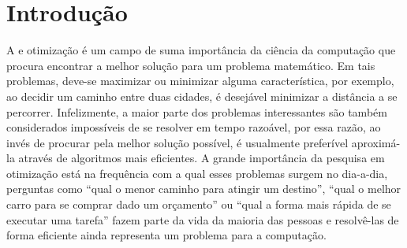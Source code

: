 \chapter[Introdução]{Introdução}

A e otimização é um campo de suma importância da ciência da computação que procura encontrar a melhor solução para um problema matemático. Em tais problemas, deve-se maximizar ou minimizar alguma característica, por exemplo, ao decidir um caminho entre duas cidades, é desejável minimizar a distância a se percorrer. Infelizmente, a maior parte dos problemas interessantes são também considerados impossíveis de se resolver em tempo razoável, por essa razão, ao invés de procurar pela melhor solução possível, é usualmente preferível aproximá-la através de algoritmos mais eficientes. A grande importância da pesquisa em otimização está na frequência com a qual esses problemas surgem no dia-a-dia, perguntas como ``qual o menor caminho para atingir um destino'', ``qual o melhor carro para se comprar dado um orçamento'' ou ``qual a forma mais rápida de se executar uma tarefa'' fazem parte da vida da maioria das pessoas e resolvê-las de forma eficiente ainda representa um problema para a computação.

